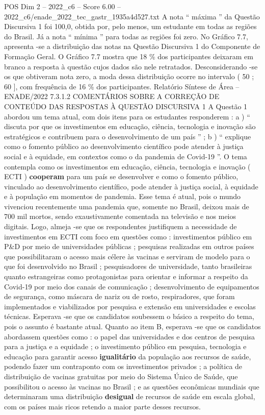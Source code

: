 \begin{textsample}{POS Dim 2 – 2022\_c6 – Score 6.00 – 2022\_c6/enade\_2022\_tec\_gastr\_1935a4d527.txt}
A nota “ máxima ” da Questão Discursiva 1 foi 100,0, obtida por, pelo menos, um estudante em todas as regiões do Brasil.
Já a nota “ mínima ” para todas as regiões foi zero.
No Gráfico 7.7, apresenta -se a distribuição das notas na Questão Discursiva 1 do Componente de Formação Geral.
O Gráfico 7.7 mostra que 18 \% dos participantes deixaram em branco a resposta à questão cujos dados são nele retratados.
Desconsiderando -se os que obtiveram nota zero, a moda dessa distribuição ocorre no intervalo ( 50 ; 60 ], com frequência de 16 \% dos participantes.
Relatório Síntese de Área – ENADE/2022 7.3.1.2 COMENTÁRIOS SOBRE A CORREÇÃO DE CONTEÚDO DAS RESPOSTAS À QUESTÃO DISCURSIVA 1 A Questão 1 abordou um tema atual, com dois itens para os estudantes responderem : a ) “ discuta por que os investimentos em educação, ciência, tecnologia e inovação são estratégicos e contribuem para o desenvolvimento de um país ” ; b ) “ explique como o fomento público ao desenvolvimento científico pode atender à justiça social e à equidade, em contextos como o da pandemia de Covid-19 ”.
O tema contempla como os investimentos em educação, ciência, tecnologia e inovação ( ECTI ) \textbf{cooperam} para um país se desenvolver e como o fomento público, vinculado ao desenvolvimento científico, pode atender à justiça social, à equidade e à população em momentos de pandemia.
Esse tema é atual, pois o mundo vivenciou recentemente uma pandemia que, somente no Brasil, deixou mais de 700 mil mortos, sendo exaustivamente comentada na televisão e nos meios digitais.
Logo, almeja -se que os respondentes justifiquem a necessidade de investimentos em ECTI com foco em questões como : investimentos público em P\&D por meio de universidades públicas ; pesquisas realizadas em outros países que possibilitaram o acesso mais célere às vacinas e serviram de modelo para o que foi desenvolvido no Brasil ; pesquisadores de universidade, tanto brasileiras quanto estrangeiras como protagonistas para orientar e informar a respeito da Covid-19 por meio dos canais de comunicação ; desenvolvimento de equipamentos de segurança, como máscara de nariz ou de rosto, respiradores, que foram implementados e viabilizados por pesquisa e extensão em universidades e escolas técnicas.
Esperava -se que os candidatos soubessem o básico a respeito do tema, pois o assunto é bastante atual.
Quanto ao item B, esperava -se que os candidatos abordassem questões como : o papel das universidades e dos centros de pesquisa para a justiça e a equidade ; o investimento público em pesquisa, tecnologia e educação para garantir acesso \textbf{igualitário} da população aos recursos de saúde, podendo fazer um contraponto com os investimentos privados ; a política de distribuição de vacinas gratuitas por meio do Sistema Único de Saúde, que possibilitou o acesso às vacinas no Brasil ; e as questões econômicas mundiais que determinaram uma distribuição \textbf{desigual} de recursos de saúde em escala global, com os países mais ricos retendo a maior parte desses recursos.

\end{textsample}
